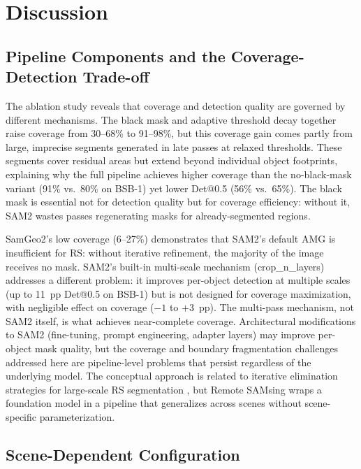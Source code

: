 \documentclass[review,11pt,authoryear]{elsarticle}
\begin{document}
\section{Discussion}
\label{sec:discussion}

\subsection{Pipeline Components and the Coverage-Detection Trade-off}
\label{sec:disc_components}

The ablation study reveals that coverage and detection quality are governed by different mechanisms. The black mask and adaptive threshold decay together raise coverage from 30--68\% to 91--98\%, but this coverage gain comes partly from large, imprecise segments generated in late passes at relaxed thresholds. These segments cover residual areas but extend beyond individual object footprints, explaining why the full pipeline achieves higher coverage than the no-black-mask variant (91\% vs.\ 80\% on BSB-1) yet lower Det@0.5 (56\% vs.\ 65\%). The black mask is essential not for detection quality but for coverage efficiency: without it, SAM2 wastes passes regenerating masks for already-segmented regions.

SamGeo2's low coverage (6--27\%) demonstrates that SAM2's default AMG is insufficient for RS: without iterative refinement, the majority of the image receives no mask. SAM2's built-in multi-scale mechanism (crop\_n\_layers) addresses a different problem: it improves per-object detection at multiple scales (up to 11~pp Det@0.5 on BSB-1) but is not designed for coverage maximization, with negligible effect on coverage ($-1$ to $+3$~pp). The multi-pass mechanism, not SAM2 itself, is what achieves near-complete coverage. Architectural modifications to SAM2 (fine-tuning, prompt engineering, adapter layers) may improve per-object mask quality, but the coverage and boundary fragmentation challenges addressed here are pipeline-level problems that persist regardless of the underlying model. The conceptual approach is related to iterative elimination strategies for large-scale RS segmentation \citep{shepherd2019large_scale}, but Remote SAMsing wraps a foundation model in a pipeline that generalizes across scenes without scene-specific parameterization.

\subsection{Scene-Dependent Configuration}
\label{sec:disc_config}
\end{document}
